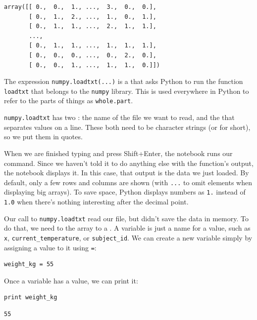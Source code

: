 \documentclass{book}
\begin{document}
\begin{verbatim}
array([[ 0.,  0.,  1., ...,  3.,  0.,  0.],
       [ 0.,  1.,  2., ...,  1.,  0.,  1.],
       [ 0.,  1.,  1., ...,  2.,  1.,  1.],
       ...,
       [ 0.,  1.,  1., ...,  1.,  1.,  1.],
       [ 0.,  0.,  0., ...,  0.,  2.,  0.],
       [ 0.,  0.,  1., ...,  1.,  1.,  0.]])
\end{verbatim}

The expression \texttt{numpy.loadtxt(...)} is a
 that asks Python to run the
function \texttt{loadtxt} that belongs to the \texttt{numpy} library.
This  is used everywhere in
Python to refer to the parts of things as \texttt{whole.part}.

\texttt{numpy.loadtxt} has two : the
name of the file we want to read, and the
 that separates values on a line. These
both need to be character strings (or  for
short), so we put them in quotes.

When we are finished typing and press Shift+Enter, the notebook runs our
command. Since we haven't told it to do anything else with the
function's output, the notebook displays it. In this case, that output
is the data we just loaded. By default, only a few rows and columns are
shown (with \texttt{...} to omit elements when displaying big arrays).
To save space, Python displays numbers as \texttt{1.} instead of
\texttt{1.0} when there's nothing interesting after the decimal point.

Our call to \texttt{numpy.loadtxt} read our file, but didn't save the
data in memory. To do that, we need to 
the array to a . A variable is just a
name for a value, such as \texttt{x}, \texttt{current\_temperature}, or
\texttt{subject\_id}. We can create a new variable simply by assigning a
value to it using \texttt{=}:

\begin{verbatim}
weight_kg = 55
\end{verbatim}

Once a variable has a value, we can print it:

\begin{verbatim}
print weight_kg
\end{verbatim}

\begin{verbatim}
55
\end{verbatim}
\end{document}
